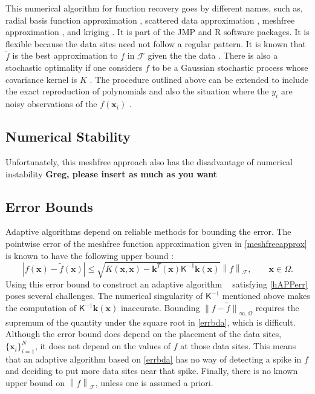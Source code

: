 \documentclass[11pt]{NSFamsart}
\newcommand{\tf}{\tilde{f}}
\newcommand{\mK}{\mathsf{K}}
\DeclareMathOperator{\APP}{APP}
\DeclareMathOperator{\hAPP}{\widehat{\APP}}
\newcommand{\bx}{{\boldsymbol{x}}}
\newcommand{\bk}{{\boldsymbol{k}}}
\newcommand{\calf}{{\mathcal{F}}}
\def\abs#1{\ensuremath{\left \lvert #1 \right \rvert}}
\newcommand{\norm}[2][{}]{\ensuremath{\left \lVert #2 \right \rVert}_{#1}}
\newcommand{\bignorm}[2][{}]{\ensuremath{\bigl \lVert #2 \bigr \rVert}_{#1}}
\begin{document}
This numerical algorithm for function recovery goes by different names, such as, radial basis function approximation \citep{Buh03a}, scattered data approximation \citep{Wen05a}, meshfree approximation \citep{Fas07a}, and kriging \citep{Ste99}. It is part of the JMP \citep{JMP11} and R \citep{R3.03_2013} software packages.  It is flexible because the data sites need not follow a regular pattern. It is known that $\tf$ is the best approximation to $f$ in $\calf$ given the the data \citep{Fas07a,Wen05a}.  There is also a stochastic optimality if one considers $f$ to be a Gaussian stochastic process whose covariance kernel is $K$ \citep{BerT-A04,Wah90}.  The procedure outlined above can be extended to include the exact reproduction of polynomials and also the situation where the $y_i$ are noisy observations of the $f(\bx_i)$ \citep{Wah90}.

\subsection*{Numerical Stability} Unfortunately, this meshfree approach also has the disadvantage of numerical instability {\bf Greg, please insert as much as you want}

\subsection*{Error Bounds} Adaptive algorithms depend on reliable methods for bounding the error.  The pointwise error of the meshfree function approximation given in \eqref{meshfreeapprox} is known to have the following upper bound \citep{???}:
\begin{equation} \label{errbda}
\abs{f(\bx)-\tf(\bx)} \le \sqrt{K(\bx,\bx)-\bk^T(\bx)\mK^{-1} \bk(\bx)} \norm[\calf]{f}, \qquad \bx \in \Omega.
\end{equation}
Using this error bound to construct an adaptive algorithm $\hAPP$  satisfying \eqref{hAPPerr} poses several challenges.  The numerical singularity of $\mK^{-1}$ mentioned above makes the computation of $\mK^{-1}\bk(\bx)$ inaccurate.  Bounding $\bignorm[\infty,\Omega]{f-\tf}$ requires the supremum of the quantity under the square root in \eqref{errbda}, which is difficult.  Although the error bound does depend on the placement of the data sites, $\{\bx_i\}_{i=1}^N$, it does not depend on the values of $f$ at those data sites.  This means that an adaptive algorithm based on \eqref{errbda} has no way of detecting a spike in $f$ and deciding to put more data sites near that spike.  Finally, there is no known upper bound on $\norm[\calf]{f}$, unless one is assumed a priori.
\end{document}
